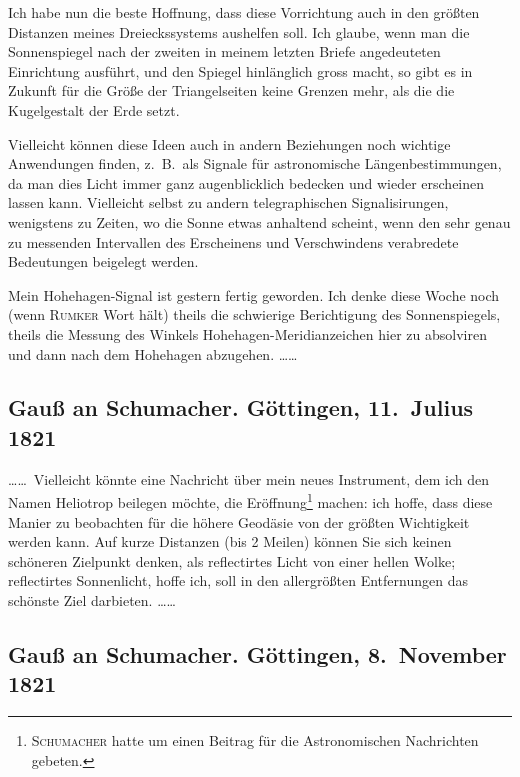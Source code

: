 \documentclass[12pt,a4paper]{article}
\theoremstyle{plain}
\theoremstyle{definition}
\theoremstyle{remark}
\begin{document}
Ich habe nun die beste Hoffnung, dass diese Vorrichtung auch in den gr\"o\ss ten Distanzen meines Dreieckssystems aushelfen soll. Ich glaube, wenn man die Sonnenspiegel nach der zweiten in meinem letzten Briefe angedeuteten Einrichtung ausf\"uhrt, und den Spiegel hinl\"anglich gross macht, so gibt es in Zukunft f\"ur die Gr\"o\ss e der Triangelseiten keine Grenzen mehr, als die die Kugelgestalt der Erde setzt.

Vielleicht k\"onnen diese Ideen auch in andern Beziehungen noch wichtige Anwendungen finden, z.~B.\ als Signale f\"ur astronomische L\"angenbestimmungen, da man dies Licht immer ganz augenblicklich bedecken und wieder erscheinen lassen kann. Vielleicht selbst zu andern telegraphischen Signalisirungen, wenigstens zu Zeiten, wo die Sonne etwas anhaltend scheint, wenn den sehr genau zu messenden Intervallen des Erscheinens und Verschwindens verabredete Bedeutungen beigelegt werden.

Mein Hohehagen-Signal ist gestern fertig geworden. Ich denke diese Woche noch (wenn \textsc{Rumker} Wort h\"alt) theils die schwierige Berichtigung des Sonnenspiegels, theils die Messung des Winkels Hohehagen-Meridianzeichen hier zu absolviren und dann nach dem Hohehagen abzugehen. \ldots\ldots

\subsection*{Gau\ss{} an Schumacher. G\"ottingen, 11.\ Julius 1821}

\ldots\ldots\ Vielleicht k\"onnte eine Nachricht \"uber mein neues Instrument, dem ich den Namen Heliotrop beilegen m\"ochte, die Er\"offnung\footnote{\textsc{Schumacher} hatte um einen Beitrag f\"ur die Astronomischen Nachrichten gebeten.} machen: ich hoffe, dass diese Manier zu beobachten f\"ur die h\"ohere Geod\"asie von der gr\"o\ss ten Wichtigkeit werden kann. Auf kurze Distanzen (bis 2 Meilen) k\"onnen Sie sich keinen sch\"oneren Zielpunkt denken, als reflectirtes Licht von einer hellen Wolke; reflectirtes Sonnenlicht, hoffe ich, soll in den allergr\"o\ss ten Entfernungen das sch\"onste Ziel darbieten. \ldots\ldots

\subsection*{Gau\ss{} an Schumacher. G\"ottingen, 8.\ November 1821}
\end{document}
